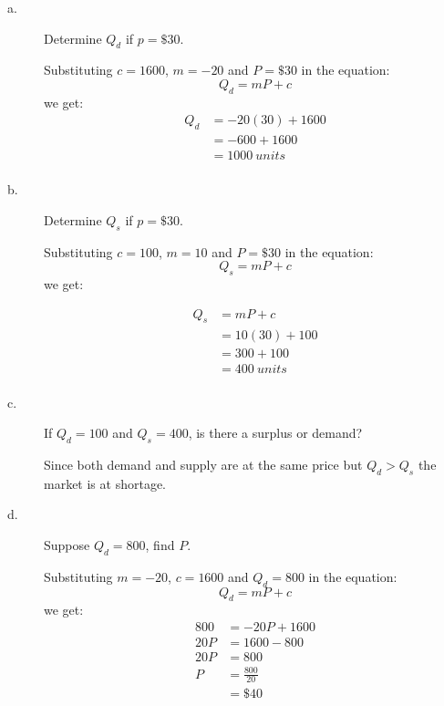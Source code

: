 \documentclass[table]{article}
\begin{document}
\begin{description}
    \item[a.] \begin{Large}Determine $Q_d$ if $p=\$30$.\end{Large}

        Substituting $c=1600$, $m=-20$ and $P=\$30$ in the equation:
        $$
            Q_d = mP + c
        $$
        we get:
        $$
            \begin{aligned}
                Q_d & = -20(30) + 1600 \\
                    & = -600 + 1600    \\
                    & =  1000 \ units  \\
            \end{aligned}
        $$

    \item[b. ] \begin{Large}Determine $Q_s$ if $p=\$30$.\end{Large}

        Substituting $c=100$, $m=10$ and $P=\$30$ in the equation:
        $$
            Q_s = mP + c
        $$
        we get:

        $$
            \begin{aligned}
                Q_s & = mP + c        \\
                    & =  10(30) + 100 \\
                    & = 300 + 100     \\
                    & = 400 \ units   \\
            \end{aligned}
        $$
    \item[c.] \begin{Large}If $Q_d=100$ and $Q_s=400$, is there a surplus or demand? \end{Large}

        Since both demand and supply are at the same price but $Q_d > Q_s$ the market is at shortage.

    \item[d.] \begin{Large}Suppose $Q_d = 800$, find $P$.\end{Large}

        Substituting $m=-20$, $c=1600$ and $Q_d=800$ in the equation:
        $$
            Q_d = mP + c
        $$
        we get:
        $$
            \begin{aligned}
                800 & = -20P+1600      \\
                20P & = 1600 - 800     \\
                20P & = 800            \\
                P   & = \frac{800}{20} \\
                    & =  \$ 40         \\
            \end{aligned}
        $$


\end{description}
\end{document}
